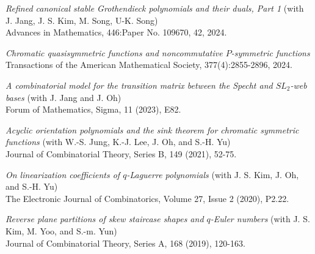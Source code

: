 \documentclass[letterpaper,11pt]{article}
\begin{document}
\begin{etaremune}
    \item \emph{Refined canonical stable Grothendieck polynomials and their duals, Part 1} (with J. Jang, J. S. Kim, M. Song, U-K. Song) \\
    Advances in Mathematics, 446:Paper No. 109670, 42, 2024.
    
    \item \emph{Chromatic quasisymmetric functions and noncommutative $P$-symmetric functions} \\
    Transactions of the American Mathematical Society, 377(4):2855-2896, 2024.

    \item \emph{A combinatorial model for the transition matrix between the Specht and $SL_2$-web bases} (with J. Jang and J. Oh) \\
    Forum of Mathematics, Sigma, 11 (2023), E82.
    
    \item \emph{Acyclic orientation polynomials and the sink theorem for chromatic symmetric functions} (with W.-S. Jung, K.-J. Lee, J. Oh, and S.-H. Yu) \\
    Journal of Combinatorial Theory, Series B, 149 (2021), 52-75.

    \item \emph{On linearization coefficients of $q$-Laguerre polynomials} (with J. S. Kim, J. Oh, and S.-H. Yu) \\
    The Electronic Journal of Combinatorics, Volume 27, Issue 2 (2020), P2.22.

    \item \emph{Reverse plane partitions of skew staircase shapes and $q$-Euler numbers} (with J. S. Kim, M. Yoo, and S.-m. Yun) \\
    Journal of Combinatorial Theory, Series A, 168 (2019), 120-163.
\end{etaremune}
	
\end{document}
